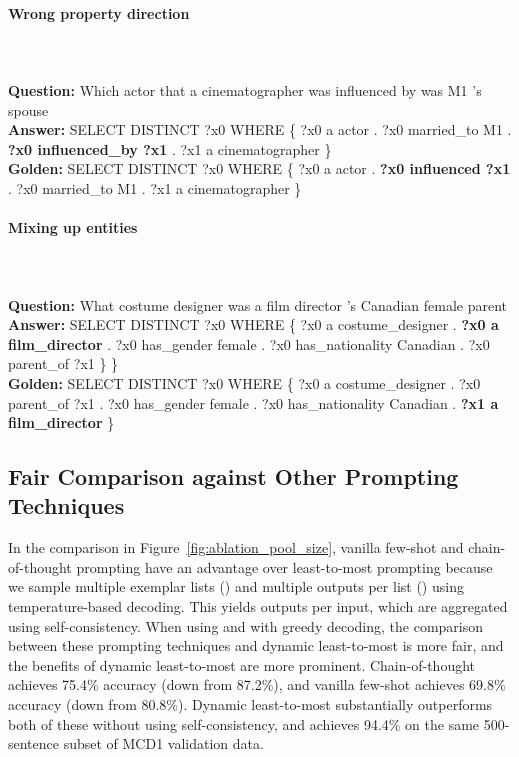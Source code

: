 \documentclass{article} \usepackage{iclr2022_conference,times}
\newcommand{\prompt}[1]{{\footnotesize \textsf{#1}}}
\begin{document}
\paragraph{Wrong property direction}
\prompt{\\
\\
\textbf{Question:} Which actor that a cinematographer was influenced by was M1 's spouse\\
\textbf{Answer:} SELECT DISTINCT ?x0 WHERE \{ ?x0 a actor . ?x0 married\_to M1 . \textbf{?x0 influenced\_by ?x1} . ?x1 a cinematographer \} \\
\textbf{Golden:} SELECT DISTINCT ?x0 WHERE \{ ?x0 a actor . \textbf{?x0 influenced ?x1} . ?x0 married\_to M1 . ?x1 a cinematographer \}
}

\paragraph{Mixing up entities}
\prompt{\\
\\
\textbf{Question:} What costume designer was a film director 's Canadian female parent\\
\textbf{Answer:} SELECT DISTINCT ?x0 WHERE \{ ?x0 a costume\_designer . \textbf{?x0 a film\_director} . ?x0 has\_gender female . ?x0 has\_nationality Canadian . ?x0 parent\_of ?x1 \} \} \\
\textbf{Golden:} SELECT DISTINCT ?x0 WHERE \{ ?x0 a costume\_designer . ?x0 parent\_of ?x1 . ?x0 has\_gender female . ?x0 has\_nationality Canadian . \textbf{?x1 a film\_director} \}
}

\subsection{Fair Comparison against Other Prompting Techniques \label{app:fair_compare}}

In the comparison in Figure~\ref{fig:ablation_pool_size}, vanilla few-shot and chain-of-thought prompting have an advantage over least-to-most prompting because we sample multiple exemplar lists () and multiple outputs per list () using temperature-based decoding. This yields  outputs per input, which are aggregated using self-consistency. When using  and  with greedy decoding, the comparison between these prompting techniques and dynamic least-to-most is more fair, and the benefits of dynamic least-to-most are more prominent. Chain-of-thought achieves 75.4\% accuracy (down from 87.2\%), and vanilla few-shot achieves 69.8\% accuracy (down from 80.8\%). Dynamic least-to-most substantially outperforms both of these without using self-consistency, and achieves 94.4\% on the same 500-sentence subset of MCD1 validation data.
\end{document}

